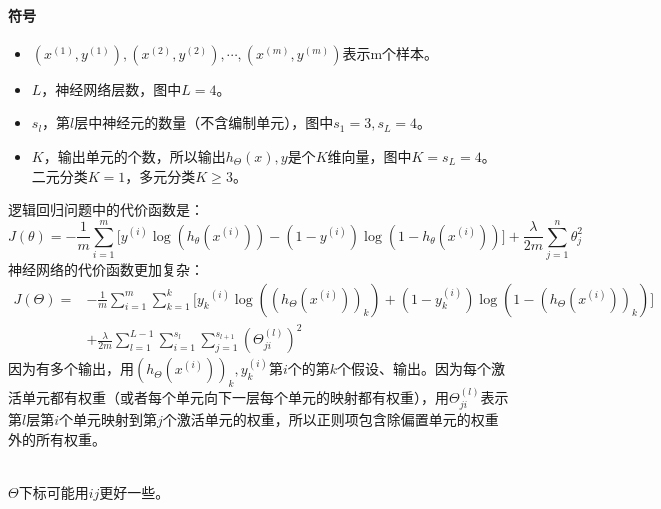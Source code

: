 \documentclass[../main.tex]{subfiles}
\begin{document}
\paragraph{符号}
\begin{itemize}
    \item \({(x^{(1)}, y^{(1)}), (x^{(2)}, y^{(2)}), ⋯, (x^{(m)}, y^{(m)})}\)表示m个样本。
    \item \(L\)，神经网络层数，图中\(L=4\)。
    \item \(s_l\)，第\(l\)层中神经元的数量（不含编制单元），图中\(s_1=3, s_L=4\)。
    \item \(K\)，输出单元的个数，所以输出\(h_Θ(x), y\)是个\(K\)维向量，图中\(K=s_L=4\)。\\
    二元分类\(K=1\)，多元分类\(K≥3\)。
\end{itemize}
逻辑回归问题中的代价函数是：\[
    J(θ) = -\frac{1}{m}\sum\limits_{i=1}^{m}\bigg[y^{(i)}\log(h_θ(x^{(i)})) - (1-y^{(i)})\log(1- h_θ(x^{(i)}))\bigg]
    + \frac{λ}{2m}\sum\limits_{j=1}^{n}θ_j^2
\]
神经网络的代价函数更加复杂：
\begin{equation}
    \begin{aligned}\label{eq:神经网络的代价函数}
        J(Θ) = & -\frac{1}{m}\sum\limits_{i=1}^{m} \sum\limits_{k=1}^{k}\bigg[ {y_k}^{(i)} \log((h_Θ(x^{(i)}))_k) + ( 1 - y_k^{(i)} ) \log(1- (h_Θ(x^{(i)}))_k)\bigg] \\
               & + \frac{\lambda}{2m} \sum\limits_{l=1}^{L-1} \sum\limits_{i=1}^{s_l} \sum\limits_{j=1}^{s_{l+1}} (Θ_{ji}^{(l)})^2
    \end{aligned}
\end{equation}
因为有多个输出，用\((h_Θ(x^{(i)}))_k, y^{(i)}_k\)第\(i\)个的第\(k\)个假设、输出。因为每个激活单元都有权重（或者每个单元向下一层每个单元的映射都有权重），用\(Θ_{ji}^{(l)}\)表示第\(l\)层第\(i\)个单元映射到第\(j\)个激活单元的权重，所以正则项包含除偏置单元的权重外的所有权重。\\
\\\begin{remark}
    \(Θ\)下标可能用\(ij\)更好一些。
\end{remark}
\end{document}
